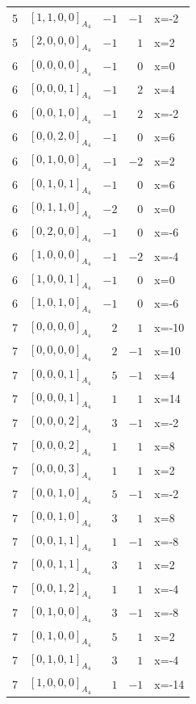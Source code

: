 \documentclass[11pt]{article}
\newcommand{\Dynkin}[1]{#1}
\begin{document}
\begin{longtable}{r l r r l}
5 & $\Dynkin{[1,1,0,0]_{A_4}}$ & $-1$ & $-1$ & x=-2\\
5 & $\Dynkin{[2,0,0,0]_{A_4}}$ & $-1$ & $1$ & x=2\\
6 & $\Dynkin{[0,0,0,0]_{A_4}}$ & $-1$ & $0$ & x=0\\
6 & $\Dynkin{[0,0,0,1]_{A_4}}$ & $-1$ & $2$ & x=4\\
6 & $\Dynkin{[0,0,1,0]_{A_4}}$ & $-1$ & $2$ & x=-2\\
6 & $\Dynkin{[0,0,2,0]_{A_4}}$ & $-1$ & $0$ & x=6\\
6 & $\Dynkin{[0,1,0,0]_{A_4}}$ & $-1$ & $-2$ & x=2\\
6 & $\Dynkin{[0,1,0,1]_{A_4}}$ & $-1$ & $0$ & x=6\\
6 & $\Dynkin{[0,1,1,0]_{A_4}}$ & $-2$ & $0$ & x=0\\
6 & $\Dynkin{[0,2,0,0]_{A_4}}$ & $-1$ & $0$ & x=-6\\
6 & $\Dynkin{[1,0,0,0]_{A_4}}$ & $-1$ & $-2$ & x=-4\\
6 & $\Dynkin{[1,0,0,1]_{A_4}}$ & $-1$ & $0$ & x=0\\
6 & $\Dynkin{[1,0,1,0]_{A_4}}$ & $-1$ & $0$ & x=-6\\
7 & $\Dynkin{[0,0,0,0]_{A_4}}$ & $2$ & $1$ & x=-10\\
7 & $\Dynkin{[0,0,0,0]_{A_4}}$ & $2$ & $-1$ & x=10\\
7 & $\Dynkin{[0,0,0,1]_{A_4}}$ & $5$ & $-1$ & x=4\\
7 & $\Dynkin{[0,0,0,1]_{A_4}}$ & $1$ & $1$ & x=14\\
7 & $\Dynkin{[0,0,0,2]_{A_4}}$ & $3$ & $-1$ & x=-2\\
7 & $\Dynkin{[0,0,0,2]_{A_4}}$ & $1$ & $1$ & x=8\\
7 & $\Dynkin{[0,0,0,3]_{A_4}}$ & $1$ & $1$ & x=2\\
7 & $\Dynkin{[0,0,1,0]_{A_4}}$ & $5$ & $-1$ & x=-2\\
7 & $\Dynkin{[0,0,1,0]_{A_4}}$ & $3$ & $1$ & x=8\\
7 & $\Dynkin{[0,0,1,1]_{A_4}}$ & $1$ & $-1$ & x=-8\\
7 & $\Dynkin{[0,0,1,1]_{A_4}}$ & $3$ & $1$ & x=2\\
7 & $\Dynkin{[0,0,1,2]_{A_4}}$ & $1$ & $1$ & x=-4\\
7 & $\Dynkin{[0,1,0,0]_{A_4}}$ & $3$ & $-1$ & x=-8\\
7 & $\Dynkin{[0,1,0,0]_{A_4}}$ & $5$ & $1$ & x=2\\
7 & $\Dynkin{[0,1,0,1]_{A_4}}$ & $3$ & $1$ & x=-4\\
7 & $\Dynkin{[1,0,0,0]_{A_4}}$ & $1$ & $-1$ & x=-14\\

\end{longtable}
\end{document}
